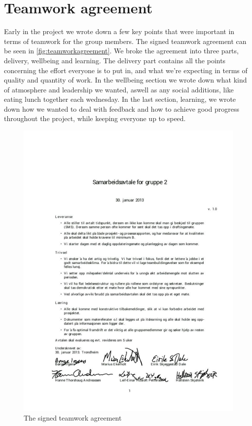 \section{Teamwork agreement}
Early in the project we wrote down a few key points that were important in terms of teamwork for the group members. The signed teamwork agreement can be seen in \autoref{fig:teamworkagreement}. We broke the agreement into three parts, delivery, wellbeing and learning. The delivery part contains all the points concerning the effort everyone is to put in, and what we're expecting in terms of quality and quantity of work. In the wellbeing section we wrote down what kind of atmosphere and leadership we wanted, aswell as any social additions, like eating lunch together each wednesday. In the last section, learning, we wrote down how we wanted to deal with feedback and how to achieve good progress throughout the project, while keeping everyone up to speed.

\begin{figure}
	\begin{center}
		\includegraphics[width=1.0\textwidth]{Figures/teamworkagreement.pdf}
	\end{center}
	\caption[Teamwork agreement]{The signed teamwork agreement}
	\label{fig:teamworkagreement}
\end{figure}